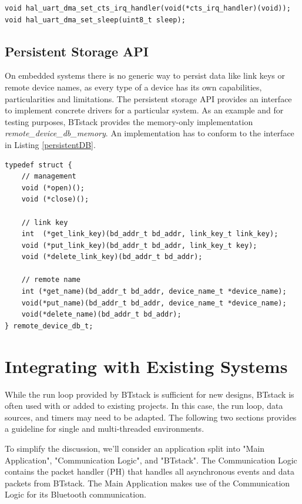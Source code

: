 \documentclass[a4paper,titlepage,oneside,12pt]{amsart} %
\begin{document}
\begin{lstlisting}
void hal_uart_dma_set_cts_irq_handler(void(*cts_irq_handler)(void));
void hal_uart_dma_set_sleep(uint8_t sleep);
\end{lstlisting}


\subsection{Persistent Storage API}
\label{section:persistent_storage}

On embedded systems there is no generic way to persist data like link keys or remote device names, as every type of a device has its own capabilities, particularities and limitations. The persistent storage API provides an interface to implement concrete drivers for a particular system. As an example and for testing purposes, BTstack provides the memory-only implementation \emph{remote\_device\_db\_memory}. An implementation has to conform to the interface in Listing \ref{persistentDB}.
\\

\begin{lstlisting}[float, caption=Persistent Storage Interface., label=persistentDB]
typedef struct {
    // management
    void (*open)();
    void (*close)();
    
    // link key
    int  (*get_link_key)(bd_addr_t bd_addr, link_key_t link_key);
    void (*put_link_key)(bd_addr_t bd_addr, link_key_t key);
    void (*delete_link_key)(bd_addr_t bd_addr);
    
    // remote name
    int (*get_name)(bd_addr_t bd_addr, device_name_t *device_name);
    void(*put_name)(bd_addr_t bd_addr, device_name_t *device_name);
    void(*delete_name)(bd_addr_t bd_addr);
} remote_device_db_t;

\end{lstlisting}

\section{Integrating with Existing Systems}

While the run loop provided by BTstack is sufficient for new designs, BTstack is often used with or added to existing projects. In this case, the run loop, data sources, and timers may need to be adapted. The following two sections provides a guideline for single and multi-threaded environments.

To simplify the discussion, we'll consider an application split into "Main \mbox{Application}", "Communication Logic", and "BTstack". The Communication Logic contains the packet handler (PH) that handles all asynchronous events and data packets from BTstack. The Main Application makes use of the Communication Logic for its Bluetooth communication.
\end{document}
